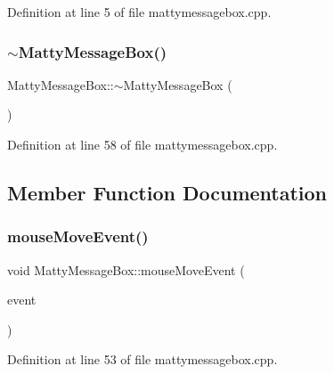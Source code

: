 Definition at line 5 of file mattymessagebox.\+cpp.

\hypertarget{classMattyMessageBox_ac33dcf18a7a03a04f27a893e4fff091a}{}\label{classMattyMessageBox_ac33dcf18a7a03a04f27a893e4fff091a} 
\subsubsection{\texorpdfstring{$\sim$\+Matty\+Message\+Box()}{~MattyMessageBox()}}
{\footnotesize\ttfamily Matty\+Message\+Box\+::$\sim$\+Matty\+Message\+Box (\begin{DoxyParamCaption}{ }\end{DoxyParamCaption})}



Definition at line 58 of file mattymessagebox.\+cpp.



\subsection{Member Function Documentation}
\hypertarget{classMattyMessageBox_ad8a35df269ef14ea29c68cd9faa1ffeb}{}\label{classMattyMessageBox_ad8a35df269ef14ea29c68cd9faa1ffeb} 
\subsubsection{\texorpdfstring{mouse\+Move\+Event()}{mouseMoveEvent()}}
{\footnotesize\ttfamily void Matty\+Message\+Box\+::mouse\+Move\+Event (\begin{DoxyParamCaption}\item[{Q\+Mouse\+Event $\ast$}]{event }\end{DoxyParamCaption})\hspace{0.3cm}{\ttfamily [private]}}



Definition at line 53 of file mattymessagebox.\+cpp.

\hypertarget{classMattyMessageBox_a9f466cebc32e2bcf238c63a15c788778}{}\label{classMattyMessageBox_a9f466cebc32e2bcf238c63a15c788778} 
